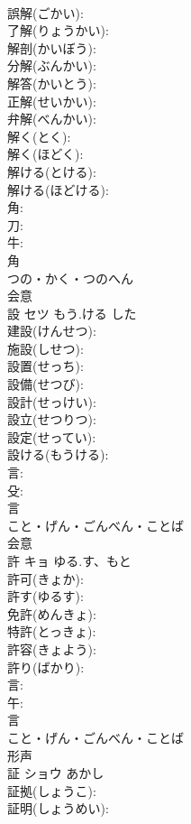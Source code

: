 \documentclass[8pt]{extreport}
\begin{document}
\begin{CJK}{UTF8}{min}
\\	誤解(ごかい): 
\\	了解(りょうかい): 
\\	解剖(かいぼう): 
\\	分解(ぶんかい): 
\\	解答(かいとう): 
\\	正解(せいかい): 
\\	弁解(べんかい): 
\\	解く(とく): 
\\	解く(ほどく): 
\\	解ける(とける): 
\\	解ける(ほどける): 
\\	角: 
\\	刀: 
\\	牛: 
\\	角	
\\	つの・かく・つのへん	
\\	会意 
\\	設	セツ	もう.ける	した	
\\	建設(けんせつ): 
\\	施設(しせつ): 
\\	設置(せっち): 
\\	設備(せつび): 
\\	設計(せっけい): 
\\	設立(せつりつ): 
\\	設定(せってい): 
\\	設ける(もうける): 
\\	言: 
\\	殳: 
\\	言	
\\	こと・げん・ごんべん・ことば	
\\	会意 
\\	許	キョ	ゆる.す、もと		
\\	許可(きょか): 
\\	許す(ゆるす): 
\\	免許(めんきょ): 
\\	特許(とっきょ): 
\\	許容(きょよう): 
\\	許り(ばかり): 
\\	言: 
\\	午: 
\\	言	
\\	こと・げん・ごんべん・ことば	
\\	形声 
\\	証	ショウ	あかし		
\\	証拠(しょうこ): 
\\	証明(しょうめい): 

\end{CJK}
\end{document}
